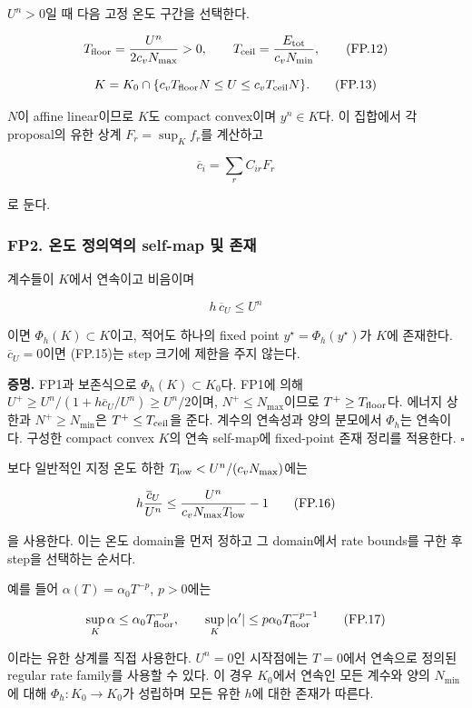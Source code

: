 \documentclass[11pt,a4paper]{article}
\begin{document}
\(U^n>0\)일 때 다음 고정 온도 구간을 선택한다.

\[
T_{\rm floor}=\frac{U^n}{2c_vN_{\max}}>0,\qquad
T_{\rm ceil}=\frac{E_{\rm tot}}{c_vN_{\min}},
\tag{FP.12}
\]

\[
K=K_0\cap\{c_vT_{\rm floor}N\le U
\le c_vT_{\rm ceil}N\}.
\tag{FP.13}
\]

\(N\)이 affine linear이므로 \(K\)도 compact convex이며 \(y^n\in K\)다. 이 집합에서 각 proposal의 유한 상계 \(F_r=\sup_Kf_r\)를 계산하고

\[
\overline c_i=\sum_r C_{ir}F_r
\tag{FP.14}
\]

로 둔다.

\hypertarget{fp2.-uxc628uxb3c4-uxc815uxc758uxc5eduxc758-self-map-uxbc0f-uxc874uxc7ac}{%
\subsubsection{FP2. 온도 정의역의 self-map 및 존재}\label{fp2.-uxc628uxb3c4-uxc815uxc758uxc5eduxc758-self-map-uxbc0f-uxc874uxc7ac}}

계수들이 \(K\)에서 연속이고 비음이며

\[
\boxed{h\,\overline c_U\le U^n}
\tag{FP.15}
\]

이면 \(\Phi_h(K)\subset K\)이고, 적어도 하나의 fixed point \(y^\star=\Phi_h(y^\star)\)가 \(K\)에 존재한다. \(\overline c_U=0\)이면 (FP.15)는 step 크기에 제한을 주지 않는다.

\textbf{증명.} FP1과 보존식으로 \(\Phi_h(K)\subset K_0\)다. FP1에 의해 \(U^+\ge U^n/(1+h\overline c_U/U^n)\ge U^n/2\)이며, \(N^+\le N_{\max}\)이므로 \(T^+\ge T_{\rm floor}\)다. 에너지 상한과 \(N^+\ge N_{\min}\)은 \(T^+\le T_{\rm ceil}\)을 준다. 계수의 연속성과 양의 분모에서 \(\Phi_h\)는 연속이다. 구성한 compact convex \(K\)의 연속 self-map에 fixed-point 존재 정리를 적용한다. \(\square\)

보다 일반적인 지정 온도 하한 \(T_{\rm low}<U^n/(c_vN_{\max})\)에는

\[
h\frac{\overline c_U}{U^n}
\le
\frac{U^n}{c_vN_{\max}T_{\rm low}}-1
\tag{FP.16}
\]

을 사용한다. 이는 온도 domain을 먼저 정하고 그 domain에서 rate bounds를 구한 후 step을 선택하는 순서다.

예를 들어 \(\alpha(T)=\alpha_0T^{-p}\), \(p>0\)에는

\[
\sup_K\alpha\le\alpha_0T_{\rm floor}^{-p},
\qquad
\sup_K|\alpha'|
\le p\alpha_0T_{\rm floor}^{-p-1}
\tag{FP.17}
\]

이라는 유한 상계를 직접 사용한다. \(U^n=0\)인 시작점에는 \(T=0\)에서 연속으로 정의된 regular rate family를 사용할 수 있다. 이 경우 \(K_0\)에서 연속인 모든 계수와 양의 \(N_{\min}\)에 대해 \(\Phi_h:K_0\to K_0\)가 성립하며 모든 유한 \(h\)에 대한 존재가 따른다.
\end{document}
